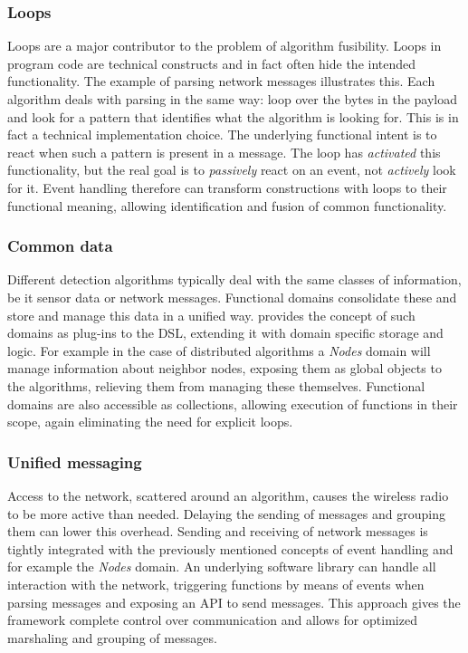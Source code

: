 \documentclass[3p,times,procedia]{elsarticle}
\begin{document}
\subsubsection{Loops}

Loops are a major contributor to the problem of algorithm fusibility. Loops in
program code are technical constructs and in fact often hide the intended
functionality. The example of parsing network messages illustrates this. Each
algorithm deals with parsing in the same way: loop over the bytes in the
payload and look for a pattern that identifies what the algorithm is looking
for. This is in fact a technical implementation choice. The underlying
functional intent is to react when such a pattern is present in a message. The
loop has \emph{activated} this functionality, but the real goal is to
\emph{passively} react on an event, not \emph{actively} look for it. Event
handling therefore can transform constructions with loops to their functional
meaning, allowing identification and fusion of common functionality.

\subsubsection{Common data}

Different detection algorithms typically deal with the same classes of
information, be it sensor data or network messages. Functional domains
consolidate these and store and manage this data in a unified way. \FOO
provides the concept of such domains as plug-ins to the DSL, extending it with
domain specific storage and logic. For example in the case of distributed
algorithms a \emph{Nodes} domain will manage information about neighbor nodes,
exposing them as global objects to the algorithms, relieving them from managing
these themselves. Functional domains are also accessible as collections,
allowing execution of functions in their scope, again eliminating the need for
explicit loops.

\subsubsection{Unified messaging}
\label{dsl-unified-msg}

Access to the network, scattered around an algorithm, causes the wireless radio
to be more active than needed. Delaying the sending of messages and grouping
them can lower this overhead. Sending and receiving of network messages is
tightly integrated with the previously mentioned concepts of event handling and
for example the \emph{Nodes} domain. An underlying software library can handle
all interaction with the network, triggering functions by means of events when
parsing messages and exposing an API to send messages. This approach gives the
framework complete control over communication and allows for optimized
marshaling and grouping of messages.
\end{document}
